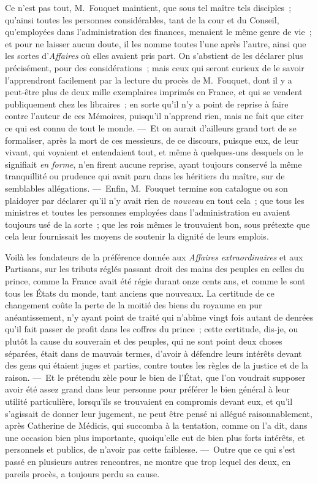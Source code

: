 \documentclass[french,twoside]{book} %
\begin{document}
Ce n’est pas tout, M. Fouquet maintient, que sous tel maître tels disciples ; qu’ainsi toutes les personnes considérables, tant de la cour et du Conseil, qu’employées dans l’administration des finances, menaient le même genre de vie ; et pour ne laisser aucun doute, il les nomme toutes l’une après l’autre, ainsi que les sortes d’{\itshape Affaires} où elles avaient pris part. On s’abstient de les déclarer plus précisément, pour des considérations ; mais ceux qui seront curieux de le savoir l’apprendront facilement par la lecture du procès de M. Fouquet, dont il y a peut-être plus de deux mille exemplaires imprimés en France, et qui se vendent publiquement chez les libraires ; en sorte qu’il n’y a point de reprise à faire contre l’auteur de ces Mémoires, puisqu’il n’apprend rien, mais ne fait que citer ce qui est connu de tout le monde. — Et on aurait d’ailleurs grand tort de se formaliser, après la mort de ces messieurs, de ce discours, puisque eux, de leur vivant, qui voyaient et entendaient tout, et même à quelques-uns desquels on le signifiait {\itshape en forme}, n’en firent aucune reprise, ayant toujours conservé la même tranquillité ou prudence qui avait paru dans les héritiers du maître, sur de semblables allégations. — Enfin, M. Fouquet termine son catalogue ou son plaidoyer par déclarer qu’il n’y avait rien de {\itshape nouveau} en tout cela ; que tous les ministres et toutes les personnes employées dans l’administration eu avaient toujours usé de la sorte ; que les rois mêmes le trouvaient bon, sous prétexte que cela leur fournissait les moyens de soutenir la dignité de leurs emplois.\par
Voilà les fondateurs de la préférence donnée aux {\itshape Affaires extraordinaires} et aux Partisans, sur les tributs réglés passant droit des mains des peuples en celles du prince, comme la France avait été régie durant onze cents ans, et comme le sont tous les États du monde, tant anciens que nouveaux. La certitude de ce changement coûte la perte de la moitié des biens du royaume en pur anéantissement, n’y ayant point de traité qui n’abîme vingt fois autant de denrées qu’il fait passer de profit dans les coffres du prince ; cette certitude, dis-je, ou plutôt la cause du souverain et des peuples, qui ne sont point deux choses séparées, était dans de mauvais termes, d’avoir à défendre leurs intérêts devant des gens qui étaient juges et parties, contre toutes les règles de la justice et de la raison. — Et le prétendu zèle pour le bien de l’État, que l’on voudrait supposer avoir été assez grand dans leur personne pour préférer le bien général à leur utilité particulière, lorsqu’ils se trouvaient en compromis devant eux, et qu’il s’agissait de donner leur jugement, ne peut être pensé ni allégué raisonnablement, après Catherine de Médicis, qui succomba à la tentation, comme on l’a dit, dans une occasion bien plus importante, quoiqu’elle eut de bien plus forts intérêts, et personnels et publics, de n’avoir pas cette faiblesse. — Outre que ce qui s’est passé en plusieurs autres rencontres, ne montre que trop lequel des deux, en pareils procès, a toujours perdu sa cause.\par
\end{document}
